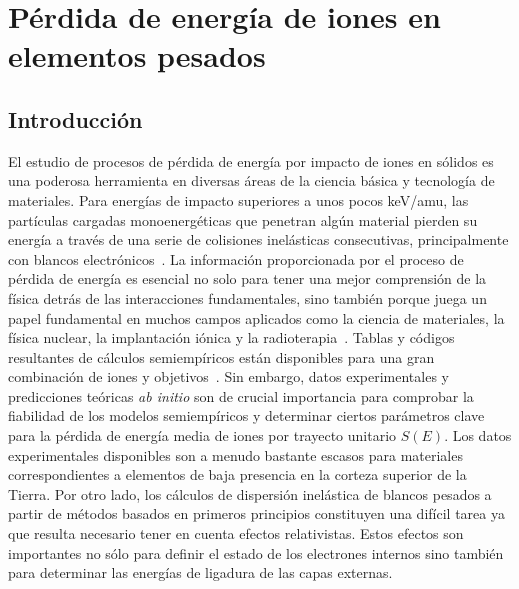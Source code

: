 \chapter{Pérdida de energía de iones en elementos pesados}

\section{Introducción}
\label{sec:intro}

El estudio de procesos de pérdida de energía por impacto de iones 
en sólidos es una poderosa herramienta en diversas áreas de la ciencia
básica y tecnología de materiales. Para energías de impacto superiores 
a unos pocos keV/amu, las partículas cargadas monoenergéticas que 
penetran algún material pierden su energía a través de una serie de 
colisiones inelásticas consecutivas, principalmente con blancos
electrónicos~\cite{Chu:01,Sigmund:06}. La información proporcionada por 
el proceso de pérdida de energía es esencial no solo para tener una 
mejor comprensión de la física detrás de las interacciones fundamentales, 
sino también porque juega un papel fundamental en muchos campos 
aplicados como la ciencia de materiales, la física nuclear, la 
implantación iónica y la radioterapia~\cite{Sigmund:06,Schardt:10}. 
Tablas y códigos resultantes de cálculos semiempíricos están disponibles 
para una gran combinación de iones y objetivos~\cite{iaea_codes,Paul:03}. 
Sin embargo, datos experimentales y predicciones teóricas 
\textit{ab initio} son de crucial importancia para comprobar la 
fiabilidad de los modelos semiempíricos y determinar ciertos 
parámetros clave~\cite{Diwan:15,Damache:04,Damache:02} para la pérdida 
de energía media de iones por trayecto unitario $S(E)$. Los datos 
experimentales disponibles son a menudo bastante escasos para materiales 
correspondientes a elementos de baja presencia en la corteza superior de 
la Tierra. Por otro lado, los cálculos de dispersión inelástica de 
blancos pesados a partir de métodos basados en primeros principios 
constituyen una difícil tarea ya que resulta necesario tener en cuenta 
efectos relativistas. Estos efectos son importantes no sólo para definir 
el estado de los electrones internos sino también para determinar las 
energías de ligadura de las capas externas.

